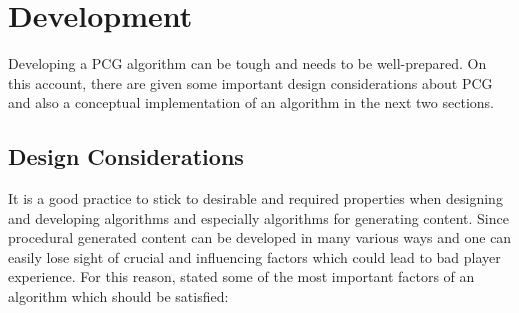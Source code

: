\documentclass[MGS,Master,english]{twbook}%
\begin{document}
\section{Development}
Developing a PCG algorithm can be tough and needs to be well-prepared. On this account, there are given some important design considerations about PCG and also a conceptual implementation of an algorithm in the next two sections.

\subsection{Design Considerations}
It is a good practice to stick to desirable and required properties when designing and developing algorithms and especially algorithms for generating content. Since procedural generated content can be developed in many various ways and one can easily lose sight of crucial and influencing factors which could lead to bad player experience. For this reason, \cite{pcg::book} stated some of the most important factors of an algorithm which should be satisfied:
\end{document}

